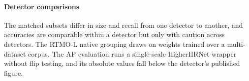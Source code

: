 \paragraph{Detector comparisons}
The matched subsets differ in size and recall from one detector to another,
and accuracies are comparable within a detector but only with caution across detectors.
The RTMO-L native grouping draws on weights trained over a multi-dataset corpus.
The AP evaluation runs a single-scale HigherHRNet wrapper without flip testing,
and its absolute values fall below the detector's published figure.